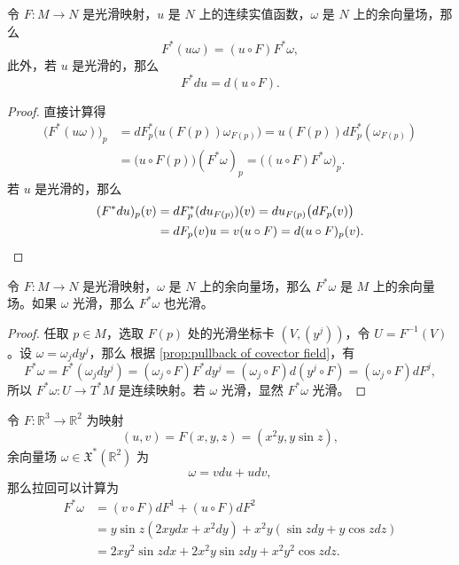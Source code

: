 \documentclass[fontset=none]{Notes}
\begin{document}
\begin{proposition}\label{prop:pullback of covector field}
  令 $F:M\to N$ 是光滑映射，$u$ 是 $N$ 上的连续实值函数，$\omega$ 是
  $N$ 上的余向量场，那么
  \[
    F^*(u\omega)=(u\circ F)F^*\omega,  
  \]
  此外，若 $u$ 是光滑的，那么
  \[
    F^*du=d(u\circ F).  
  \]
\end{proposition}
\begin{proof}
  直接计算得
  \begin{align*}
    \bigl(F^*(u\omega)\bigr)_p&=dF_p^*\bigl(u(F(p))\omega_{F(p)}\bigr)
    =u(F(p))dF_p^*(\omega_{F(p)})\\
    &=\bigl(u\circ F(p)\bigr) (F^*\omega)_p=\bigl((u\circ F)F^*\omega\bigr)_p.
  \end{align*}
  若 $u$ 是光滑的，那么
  \begin{align*}
    (F^*du)_p(v)&=dF_p^*(du_{F(p)})(v)=du_{F(p)}\bigl(dF_p(v)\bigr)\\
    &=dF_p(v)u=v(u\circ F)=d(u\circ F)_p(v).\qedhere
  \end{align*}
\end{proof}

\begin{proposition}
  令 $F:M\to N$ 是光滑映射，$\omega$ 是
  $N$ 上的余向量场，那么 $F^*\omega$ 是 $M$ 上的余向量场。如果
  $\omega$ 光滑，那么 $F^*\omega$ 也光滑。
\end{proposition}
\begin{proof}
  任取 $p\in M$，选取 $F(p)$ 处的光滑坐标卡 $(V,(y^j))$，令
  $U=F^{-1}(V)$。设 $\omega=\omega_jdy^j$，那么
  根据 \autoref{prop:pullback of covector field}，有
  \[
    F^*\omega=F^*\left(\omega_jdy^j\right)=
    (\omega_j\circ F)F^*dy^j=
    (\omega_j\circ F)d(y^j\circ F)=(\omega_j\circ F)dF^j,  
  \]
  所以 $F^*\omega:U\to T^*M$ 是连续映射。若 $\omega$ 光滑，显然
  $F^*\omega$ 光滑。
\end{proof}

\begin{example}
  令 $F:\mathbb{R}^3\to \mathbb{R}^2$ 为映射
  \[
    (u,v)=F(x,y,z) =(x^2y,y\sin z),
  \]
  余向量场 $\omega\in \mathfrak{X}^*(\mathbb{R}^2)$ 为
  \[
    \omega=vdu+udv,  
  \]
  那么拉回可以计算为
  \begin{align*}
    F^*\omega&=(v\circ F)dF^1+(u\circ F)dF^2\\
    &=y\sin z (2xydx+x^2dy)+x^2y(\sin zdy+y\cos zdz)\\
    &=2xy^2\sin z dx+2x^2y\sin zdy+x^2y^2\cos zdz.
  \end{align*}
\end{example}
\end{document}
